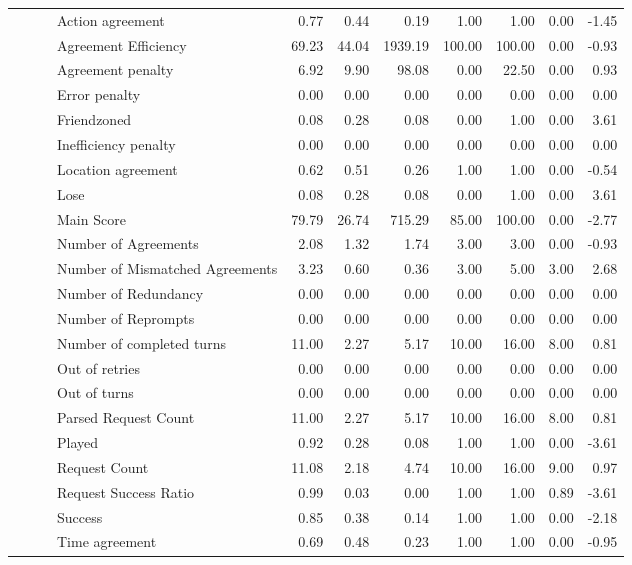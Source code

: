 \begin{tabular}{llllrrrrrrr}
 &  &  & Action agreement & 0.77 & 0.44 & 0.19 & 1.00 & 1.00 & 0.00 & -1.45 \\
 &  &  & Agreement Efficiency & 69.23 & 44.04 & 1939.19 & 100.00 & 100.00 & 0.00 & -0.93 \\
 &  &  & Agreement penalty & 6.92 & 9.90 & 98.08 & 0.00 & 22.50 & 0.00 & 0.93 \\
 &  &  & Error penalty & 0.00 & 0.00 & 0.00 & 0.00 & 0.00 & 0.00 & 0.00 \\
 &  &  & Friendzoned & 0.08 & 0.28 & 0.08 & 0.00 & 1.00 & 0.00 & 3.61 \\
 &  &  & Inefficiency penalty & 0.00 & 0.00 & 0.00 & 0.00 & 0.00 & 0.00 & 0.00 \\
 &  &  & Location agreement & 0.62 & 0.51 & 0.26 & 1.00 & 1.00 & 0.00 & -0.54 \\
 &  &  & Lose & 0.08 & 0.28 & 0.08 & 0.00 & 1.00 & 0.00 & 3.61 \\
 &  &  & Main Score & 79.79 & 26.74 & 715.29 & 85.00 & 100.00 & 0.00 & -2.77 \\
 &  &  & Number of Agreements & 2.08 & 1.32 & 1.74 & 3.00 & 3.00 & 0.00 & -0.93 \\
 &  &  & Number of Mismatched Agreements & 3.23 & 0.60 & 0.36 & 3.00 & 5.00 & 3.00 & 2.68 \\
 &  &  & Number of Redundancy & 0.00 & 0.00 & 0.00 & 0.00 & 0.00 & 0.00 & 0.00 \\
 &  &  & Number of Reprompts & 0.00 & 0.00 & 0.00 & 0.00 & 0.00 & 0.00 & 0.00 \\
 &  &  & Number of completed turns & 11.00 & 2.27 & 5.17 & 10.00 & 16.00 & 8.00 & 0.81 \\
 &  &  & Out of retries & 0.00 & 0.00 & 0.00 & 0.00 & 0.00 & 0.00 & 0.00 \\
 &  &  & Out of turns & 0.00 & 0.00 & 0.00 & 0.00 & 0.00 & 0.00 & 0.00 \\
 &  &  & Parsed Request Count & 11.00 & 2.27 & 5.17 & 10.00 & 16.00 & 8.00 & 0.81 \\
 &  &  & Played & 0.92 & 0.28 & 0.08 & 1.00 & 1.00 & 0.00 & -3.61 \\
 &  &  & Request Count & 11.08 & 2.18 & 4.74 & 10.00 & 16.00 & 9.00 & 0.97 \\
 &  &  & Request Success Ratio & 0.99 & 0.03 & 0.00 & 1.00 & 1.00 & 0.89 & -3.61 \\
 &  &  & Success & 0.85 & 0.38 & 0.14 & 1.00 & 1.00 & 0.00 & -2.18 \\
 &  &  & Time agreement & 0.69 & 0.48 & 0.23 & 1.00 & 1.00 & 0.00 & -0.95 \\

\end{tabular}
